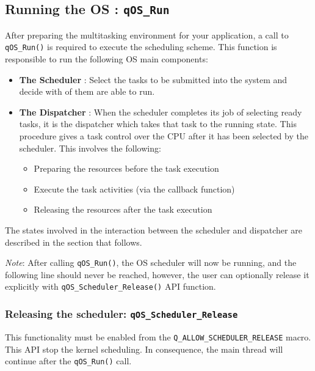 \subsection{Running the OS : \lstinline{qOS_Run}}
After preparing the multitasking environment for your application, a call to \lstinline{qOS_Run()}  is required to execute the scheduling scheme.
This function is responsible to run the following OS main components:
\begin{itemize}
    \item \textbf{The Scheduler} : Select the tasks to be submitted into the system and decide with of them are able to run.
    \item \textbf{The Dispatcher} : When the scheduler completes its job of selecting ready tasks, it is the dispatcher which takes that task to the running state. This procedure gives a task control over the CPU after it has been selected by the scheduler. This involves the following:
    \begin{itemize}
        \item Preparing the resources before the task execution
        \item Execute the task activities (via the callback function)
        \item Releasing the resources after the task execution 
    \end{itemize}
\end{itemize}

The states involved in the interaction between the scheduler and dispatcher are described in the section that follows.
\medskip

\begin{tcolorbox}
\ArrowBoldDownRight \textit{Note}: After calling \lstinline{qOS_Run()}, the OS scheduler will now be running, and the following line should never be reached, however, the user can optionally release it explicitly with \lstinline{qOS_Scheduler_Release()} API function.
\end{tcolorbox}

\subsubsection{Releasing the scheduler: \lstinline{qOS_Scheduler_Release} }
This functionality must be enabled from the \lstinline{Q_ALLOW_SCHEDULER_RELEASE} macro.
This API  stop the kernel scheduling. In consequence, the main thread will continue after the \lstinline{qOS_Run()} call. 

